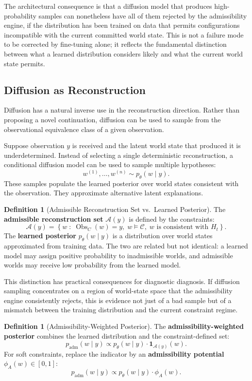 \documentclass[11pt,a4paper]{article}
\theoremstyle{plain}
\theoremstyle{definition}
\newtheorem{definition}[theorem]{Definition}
\theoremstyle{remark}
\DeclareMathOperator{\Obs}{Obs}
\begin{document}
The architectural consequence is that a diffusion model that produces high-probability samples can nonetheless have all of them rejected by the admissibility engine, if the distribution has been trained on data that permits configurations incompatible with the current committed world state. This is not a failure mode to be corrected by fine-tuning alone; it reflects the fundamental distinction between what a learned distribution considers likely and what the current world state permits.

\subsection{Diffusion as Reconstruction}

Diffusion has a natural inverse use in the reconstruction direction. Rather than proposing a novel continuation, diffusion can be used to sample from the observational equivalence class of a given observation.

Suppose observation $y$ is received and the latent world state that produced it is underdetermined. Instead of selecting a single deterministic reconstruction, a conditional diffusion model can be used to sample multiple hypotheses:
\[
w^{(1)}, \ldots, w^{(n)} \sim p_\theta(w \mid y).
\]
These samples populate the learned posterior over world states consistent with the observation. They approximate alternative latent explanations.

\begin{definition}[Admissible Reconstruction Set vs.\ Learned Posterior]
The \textbf{admissible reconstruction set} $\mathcal{A}(y)$ is defined by the constraints:
\[
\mathcal{A}(y) = \left\{ w \;:\; \Obs_{C}(w) = y,\; w \models \mathcal{C},\; w \text{ is consistent with } H_t \right\}.
\]
The \textbf{learned posterior} $p_\theta(w \mid y)$ is a distribution over world states approximated from training data. The two are related but not identical: a learned model may assign positive probability to inadmissible worlds, and admissible worlds may receive low probability from the learned model.
\end{definition}

This distinction has practical consequences for diagnostic diagnosis. If diffusion sampling concentrates on a region of world-state space that the admissibility engine consistently rejects, this is evidence not just of a bad sample but of a mismatch between the training distribution and the current constraint regime.

\begin{definition}[Admissibility-Weighted Posterior]
The \textbf{admissibility-weighted posterior} combines the learned distribution and the constraint-defined set:
\[
p_{\mathrm{adm}}(w \mid y) \propto p_\theta(w \mid y) \cdot \mathbf{1}_{\mathcal{A}(y)}(w).
\]
For soft constraints, replace the indicator by an \textbf{admissibility potential} $\phi_A(w) \in [0,1]$:
\[
p_{\mathrm{adm}}(w \mid y) \propto p_\theta(w \mid y) \cdot \phi_A(w).
\]
\end{definition}
\end{document}
